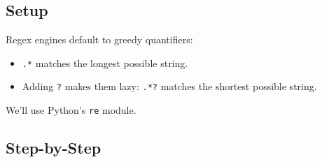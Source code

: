 \documentclass[
  letterpaper,
  DIV=11,
  numbers=noendperiod]{scrreprt}
\providecommand{\tightlist}{%
  \setlength{\itemsep}{0pt}\setlength{\parskip}{0pt}}
\begin{document}
\subsection{Setup}\label{setup-11}

Regex engines default to greedy quantifiers:

\begin{itemize}
\tightlist
\item
  \texttt{.*} matches the longest possible string.
\item
  Adding \texttt{?} makes them lazy: \texttt{.*?} matches the shortest
  possible string.
\end{itemize}

We'll use Python's \texttt{re} module.

\subsection{Step-by-Step}\label{step-by-step-11}
\end{document}
